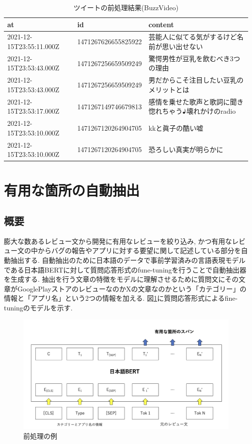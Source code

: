 \begin{table}[htbp]
  \caption{ツイートの前処理結果(BuzzVideo)}
  \label{tb:twittercsv}
  \begin{center}
  \begin{tabularx}{\linewidth}{|l|l|X|}
    \hline
    at&id&content\\\hline\hline
    2021-12-15T23:55:11.000Z&1471267626655825922&芸能人に似てる気がするけど名前が思い出せない\\\hline
    2021-12-15T23:53:43.000Z&1471267256659509249&驚愕男性が豆乳を飲むべき3つの理由\\\hline
    2021-12-15T23:53:43.000Z&1471267256659509249&男だからこそ注目したい豆乳のメリットとは\\\hline
    2021-12-15T23:53:17.000Z&1471267149746679813&感情を乗せた歌声と歌詞に聞き惚れちゃう♪壊れかけのradio\\\hline
    2021-12-15T23:53:10.000Z&1471267120264904705&kkと眞子の酷い嘘\\\hline
    2021-12-15T23:53:10.000Z&1471267120264904705&恐ろしい真実が明らかに\\\hline
  \end{tabularx}\end{center}
\end{table}


\section{有用な箇所の自動抽出}
\subsection{概要}
膨大な数あるレビュー文から開発に有用なレビューを絞り込み, かつ有用なレビュー文の中からバグの報告やアプリに対する要望に関して記述している部分を自動抽出する. 自動抽出のために日本語のデータで事前学習済みの言語表現モデルである日本語BERTに対して質問応答形式のfune-tuningを行うことで自動抽出器を生成する. 
抽出を行う文章の特徴をモデルに理解させるために質問文にその文章がGooglePlayストアのレビューなのかXの文章なのかという「カテゴリー」の情報と「アプリ名」という2つの情報を加える. 図\ref{chap:fine-tuning}に質問応答形式によるfine-tuningのモデルを示す. 
\begin{figure}[hbtp]
  \centering
  \includegraphics[scale=0.3]
       {contents/images/fine-tuning.png}
  \caption{前処理の例\label{chap:fine-tuning}}
 \end{figure}

